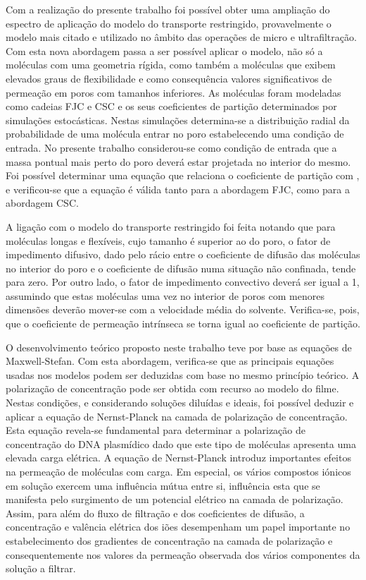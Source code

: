 Com a realização do presente trabalho foi possível obter uma ampliação do espectro de aplicação do modelo do transporte restringido, provavelmente o modelo mais citado e utilizado no âmbito das operações de micro e ultrafiltração. Com esta nova abordagem passa a ser possível aplicar o modelo, não só a moléculas com uma geometria rígida, como também a moléculas que exibem elevados graus de flexibilidade e como consequência valores significativos de permeação em poros com tamanhos inferiores. As moléculas foram modeladas como cadeias FJC e CSC e os seus coeficientes de partição determinados por simulações estocásticas. Nestas simulações determina-se a distribuição radial da probabilidade de uma molécula entrar no poro estabelecendo uma condição de entrada. No presente trabalho considerou-se como condição de entrada que a massa pontual mais perto do poro deverá estar projetada no interior do mesmo. Foi possível determinar uma equação que relaciona o coeficiente de partição com \lambdag, e verificou-se que a equação é válida tanto para a abordagem FJC, como para a abordagem CSC. 

A ligação com o modelo do transporte restringido foi feita notando que para moléculas longas e flexíveis, cujo tamanho é superior ao do poro, o fator de impedimento difusivo, dado pelo rácio entre o coeficiente de difusão das moléculas no interior do poro e o coeficiente de difusão numa situação não confinada, tende para zero. Por outro lado, o fator de impedimento convectivo deverá ser igual a 1, assumindo que estas moléculas uma vez no interior de poros com menores dimensões deverão mover-se com a velocidade média do solvente. Verifica-se, pois, que o coeficiente de permeação intrínseca se torna igual ao coeficiente de partição.

O desenvolvimento teórico proposto neste trabalho teve por base as equações de Maxwell-Stefan. Com esta abordagem, verifica-se que as principais equações usadas nos modelos podem ser deduzidas com base no mesmo princípio teórico. A polarização de concentração pode ser obtida com recurso ao modelo do filme. Nestas condições, e considerando soluções diluídas e ideais, foi possível deduzir e aplicar a equação de Nernst-Planck na camada de polarização de concentração. Esta equação revela-se fundamental para determinar a polarização de concentração do DNA plasmídico dado que este tipo de moléculas apresenta uma elevada carga elétrica. A equação de Nernst-Planck introduz importantes efeitos na permeação de moléculas com carga. Em especial, os vários compostos iónicos em solução exercem uma influência mútua entre si, influência esta que se manifesta pelo surgimento de um potencial elétrico na camada de polarização. Assim, para além do fluxo de filtração e dos coeficientes de difusão, a concentração e valência elétrica dos iões desempenham um papel importante no estabelecimento dos gradientes de concentração na camada de polarização e consequentemente nos valores da permeação observada dos vários componentes da solução a filtrar.

